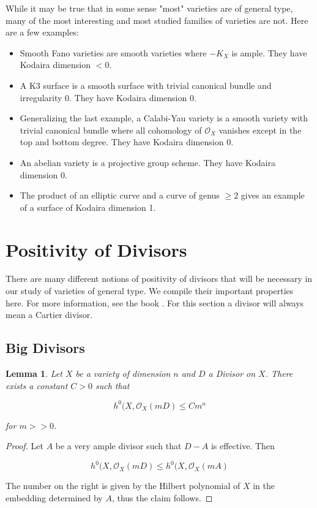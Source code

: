 \documentclass[a4paper]{article}
\newcommand{\Oc}{\mathcal{O}}
\newtheorem{lemma}[theorem]{Lemma}
\numberwithin{theorem}{section}
\begin{document}
While it may be true that in some sense "most" varieties are of general type, many of the most interesting and most studied families of varieties are not. Here are a few examples:
\begin{itemize}
\item Smooth Fano varieties are smooth varieties where $-K_X$ is ample. They have Kodaira dimension $<0$.
\item A K3 surface is a smooth surface with trivial canonical bundle and irregularity 0. They have Kodaira dimension 0.
\item Generalizing the last example, a Calabi-Yau variety is a smooth variety with trivial canonical bundle where all cohomology of $\Oc_X$ vanishes except in the top and bottom degree. They have Kodaira dimension 0.
\item An abelian variety is a projective group scheme. They have Kodaira dimension 0.
\item The product of an elliptic curve and a curve of genus $\geq 2$ gives an example of a surface of Kodaira dimension 1.
\end{itemize}


\section{Positivity of Divisors}\label{pos}

There are many different notions of positivity of divisors that will be necessary in our study of varieties of general type. We compile their important properties here. For more information, see the book \cite{MR2095471}. For this section a divisor will always mean a Cartier divisor.

\subsection{Big Divisors}

\begin{lemma} \label{upper}
Let $X$ be a variety of dimension $n$ and $D$ a  Divisor on $X$. There exists a constant $C > 0$ such that 

$$ h^0(X, \mathcal{O}_X(mD) \leq C m^n $$

for $m >> 0$.

\end{lemma}

\begin{proof}
Let $A$ be a very ample divisor such that $D-A$ is effective. Then

$$ h^0(X,\mathcal{O}_X(mD) \leq h^0(X,\mathcal{O}_X(mA) $$

The number on the right is given by the Hilbert polynomial of $X$ in the embedding determined by $A$, thus the claim follows.

\end{proof}
\end{document}
